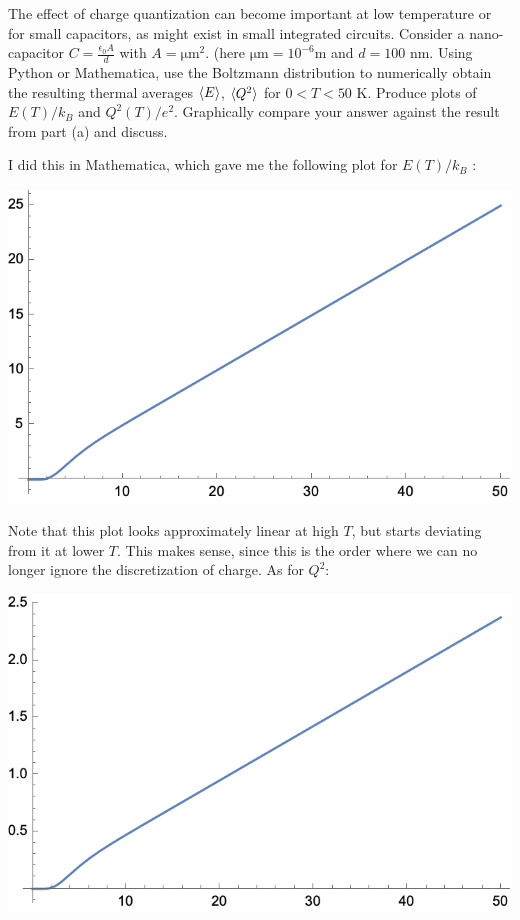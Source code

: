 \documentclass[10pt]{article}
\begin{document}
\begin{enumerate}[label=\alph*)]
			The effect of charge quantization can become important at low temperature or for small 
			capacitors, as might exist in small integrated circuits. Consider a nano-capacitor 
			\(C = \frac{\epsilon_0 A}{d}\) with $A = \mathrm{\mu m^2}$. (here \(\mathrm{\mu m} = 10^{-6} 
			\mathrm m\) and $d = 100$ nm. Using Python or Mathematica, use the Boltzmann distribution 
			to numerically obtain the resulting thermal averages $\langle E \rangle$, \(\langle Q^2 \rangle\) for 
			\(0 < T < 50 \) K. Produce plots of \(E(T) / k_B\) and \(Q^2(T) / e^2\). Graphically compare 
			your answer against the result from part (a) and discuss. 

			\begin{solution}
				I did this in Mathematica, which gave me the following plot for \(E(T)/ k_B\) :
				\begin{center}
					\includegraphics[scale=0.5]{q2a1.png}
				\end{center}
				Note that this plot looks approximately linear at high \(T\), but starts deviating 
				from it at lower \(T\). This makes sense, since this is the order where we can no longer 
				ignore the discretization of charge. As for \(Q^2\):
				\begin{center}
					\includegraphics[scale=0.5]{q2a2.png}

\end{center}
\end{solution}
\end{enumerate}
\end{document}
